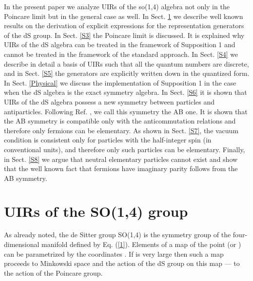 \documentclass[a4paper,12pt]{article}%
\begin{document}
In the present paper we analyze UIRs of the so(1,4) algebra
not only in the Poincare limit but in the general case
as well.
In Sect. \ref{S2} we describe well known results on the
derivation of explicit expressions for the representation
generators of the dS group. In Sect. \ref{S3} the
Poincare limit is discussed. It is explained why UIRs
of the dS algebra can be treated in the framework of
Supposition 1 and cannot be treated in the framework of
the standard approach. In Sect. \ref{S4} we describe in
detail a basis of UIRs such that all the quantum numbers
are discrete, and in Sect. \ref{S5} the generators are
explicitly written down in the quantized form. 
In Sect. \ref{Physical} we discuss the implementation
of Supposition 1 in
the case when the dS algebra is the exact symmetry algebra.
In Sect. \ref{S6} it is shown that UIRs of the dS algebra
possess a new symmetry between particles and 
antiparticles. Following Ref. \cite{lev2}, we call this
symmetry the AB one. It is shown that the AB symmetry
is compatible only with the anticommutation relations
and therefore only fermions can be elementary. As
shown in Sect. \ref{S7}, the vacuum condition is
consistent only for particles with the half-integer
spin (in conventional units), and therefore only such
particles can be elementary. Finally, in Sect. \ref{S8}
we argue that neutral elementary particles cannot
exist and show that the well known fact that fermions
have imaginary parity follows from the AB symmetry. 

\section{UIRs of the SO(1,4) group}
\label{S2}

As already noted, the de Sitter group SO(1,4) is the symmetry 
group of the four-dimensional manifold defined by Eq. (\ref{1}).
Elements of a map of the point \coordHE{} (or \coordHE{}) 
can be parametrized by the
coordinates \coordHE{}. If \coordHE{} is very large then such a
map  proceeds to Minkowski space and the action of the dS group 
on this map --- to  the action of the Poincare group.
\end{document}
